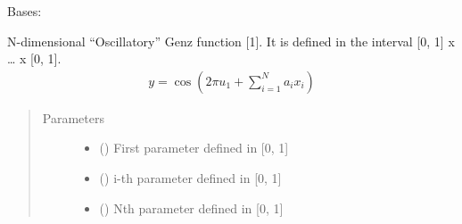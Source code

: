 \documentclass[letterpaper,10pt,english,openany,oneside]{sphinxmanual}
\begin{document}

\begin{fulllineitems}
\label{\detokenize{pygpc.testfunctions:pygpc.testfunctions.testfunctions.GenzOscillatory}}
Bases: {\hyperref[\detokenize{pygpc:pygpc.AbstractModel.AbstractModel}]{}}

N-dimensional “Oscillatory” Genz function {[}1{]}. It is defined in the interval {[}0, 1{]} x … x {[}0, 1{]}.
\begin{equation*}
\begin{split}y = \cos \left( 2 \pi u_1 + \sum_{i=1}^{N}a_i x_i \right)\end{split}
\end{equation*}\begin{quote}\begin{description}
\item[{Parameters}] \leavevmode\begin{itemize}
\item {} 
\sphinxstyleliteralstrong{\sphinxupquote{{[}}}\sphinxstyleliteralstrong{\sphinxupquote{{]}}} (\sphinxstyleliteralemphasis{\sphinxupquote{ {[}}}\sphinxstyleliteralemphasis{\sphinxupquote{{]}}}) \textendash{} First parameter defined in {[}0, 1{]}

\item {} 
\sphinxstyleliteralstrong{\sphinxupquote{{[}}}\sphinxstyleliteralstrong{\sphinxupquote{{]}}} (\sphinxstyleliteralemphasis{\sphinxupquote{ {[}}}\sphinxstyleliteralemphasis{\sphinxupquote{{]}}}) \textendash{} i-th parameter defined in {[}0, 1{]}

\item {} 
\sphinxstyleliteralstrong{\sphinxupquote{{[}}}\sphinxstyleliteralstrong{\sphinxupquote{{]}}} (\sphinxstyleliteralemphasis{\sphinxupquote{ {[}}}\sphinxstyleliteralemphasis{\sphinxupquote{{]}}}) \textendash{} Nth parameter defined in {[}0, 1{]}


\end{itemize}
\end{description}
\end{quote}
\end{fulllineitems}
\end{document}
